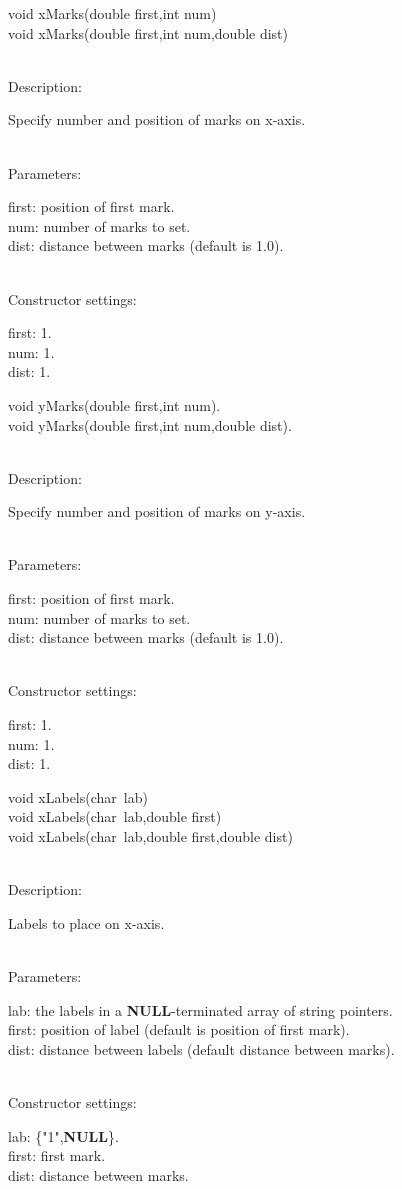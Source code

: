 \documentclass[12pt,a4paper]{article}
\newcommand{\memberitem}[1]{
                              \vspace{-0.5pc}
                              \end{minipage}\\
                              \phantom{M}#1:\\
                              \phantom{MM}
                              \begin{minipage}[t]{12cm}

                           }
\newcommand{\memdsc}{\memberitem{Description}}
\newcommand{\meminp}{\memberitem{Parameters}}
\newcommand{\memdef}{\memberitem{Constructor settings}}
\newenvironment{MemberDescr}
  {
    \begin{minipage}{15cm}
    \bf
  }
  {
    \end{minipage}
  }
\newcommand{\ppntr}{\raisebox{-0.25em}{**}\ }
\begin{document}
  \begin{MemberDescr}
    void xMarks(double first,int num)\\
    void xMarks(double first,int num,double dist)\\
    \memdsc
      Specify number and position of marks on x-axis.\\
    \meminp
      first: position of first mark.\\
      num:   number of marks to set.\\
      dist:  distance between marks (default is 1.0).\\
    \memdef
      first: 1.\\
      num:   1.\\
      dist:  1.\\
  \end{MemberDescr}

  \begin{MemberDescr}
    void yMarks(double first,int num).\\
    void yMarks(double first,int num,double dist).\\
    \memdsc
      Specify number and position of marks on y-axis.\\
    \meminp
      first: position of first mark.\\
      num:   number of marks to set.\\
      dist:  distance between marks (default is 1.0).\\
    \memdef
      first: 1.\\
      num:   1.\\
      dist:  1.\\
  \end{MemberDescr}

  \begin{MemberDescr}
    void xLabels(char\ppntr lab)\\
    void xLabels(char\ppntr lab,double first)\\
    void xLabels(char\ppntr lab,double first,double dist)\\
    \memdsc
      Labels to place on x-axis.\\
    \meminp
      lab:   the labels in a \textbf{NULL}-terminated array of string pointers.\\
      first: position of label (default is position of first mark).\\
      dist:  distance between labels (default distance between marks).\\
    \memdef
      lab: \{"1",\textbf{NULL}\}.\\
      first: first mark.\\
      dist: distance between marks.\\
  \end{MemberDescr}
\end{document}
